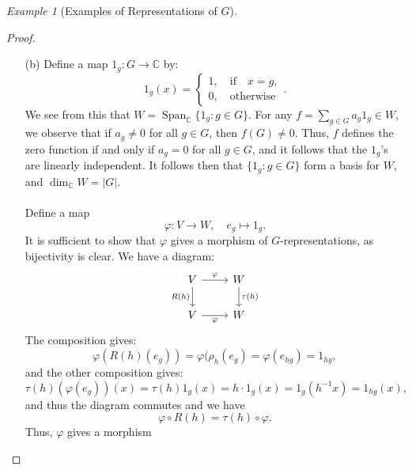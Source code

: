 \documentclass[a4paper]{report}
\theoremstyle{definition}
\theoremstyle{remark}
\theoremstyle{proposition}
\theoremstyle{conjecture}
\theoremstyle{lemma}
\theoremstyle{corollary}
\theoremstyle{exercise}
\theoremstyle{example}
\newtheorem{example}{Example}
\newcommand{\C}{\mathbb{C}}
\newcommand{\on}{\operatorname}
\begin{document}
\begin{example}[Examples of Representations of $G$]
\begin{itemize}
\begin{proof}
\begin{itemize}
                \item[(b)] Define a map $1_g : G \to \C$ by: 
                    $$1_g(x) = \begin{cases}
                        1, \quad \text{if}\quad x=g,\\
                        0,\quad \text{otherwise}
                    \end{cases}.$$
                    We see from this that 
                    $W = \on{Span}_\C \lbrace 1_g:g\in G\rbrace$.
                    For any $f = \sum_{g\in G}a_g 1_g \in W$, 
                    we observe that if $a_g \neq 0$ for all $g \in G$,
                    then $f(G) \neq 0$. 
                    Thus, $f$ defines the zero function if and only 
                    if $a_g = 0$ for all $g \in G$, and it follows that the 
                    $1_g$'s are linearly independent. It follows then that 
                    $\lbrace 1_g: g\in G\rbrace$ form a basis for $W$,
                    and $\dim_\C W = \vert G \vert$.\\\\
                    Define a map $$\varphi : V \longrightarrow W,\quad e_g \longmapsto 1_g.$$
                    It is sufficient to show that $\varphi$ gives a morphism
                    of $G$-representations, as bijectivity is clear.
                    We have a diagram:
                    $$
                    \begin{tikzcd}
                    V \arrow[r, "\varphi"] \arrow[d, "R(h)"'] & W \arrow[d, "\tau(h)"] \\
                    V \arrow[r, "\varphi"']                   & W
                    \end{tikzcd}$$
                    The composition gives: $$\varphi(R(h)(e_g))=\varphi(\rho_h(e_g) = \varphi(e_{hg}) = 1_{hg},$$
                    and the other composition gives:
                    $$\tau(h)(\varphi(e_g))(x) = \tau(h) 1_g(x) = h\cdot 1_g(x) = 1_g(h^{-1}x) = 1_{hg}(x),$$
                    and thus the diagram commutes and we have 
                    $$\varphi \circ R(h) = \tau(h) \circ \varphi.$$
                    Thus, $\varphi$ gives a morphism

\end{itemize}
\end{proof}
\end{itemize}
\end{example}
\end{document}
